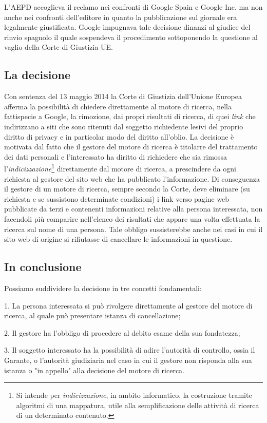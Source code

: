L'AEPD accoglieva il reclamo nei confronti di Google Spain e Google Inc. ma non anche nei confronti dell'editore in quanto la pubblicazione sul giornale era legalmente giustificata.
Google impugnava tale decisione dinanzi al giudice del rinvio spagnolo il quale sospendeva il procedimento sottoponendo la questione al vaglio della Corte di Giustizia UE.
\subsection{La decisione}
Con sentenza del 13 maggio 2014 la Corte di Giustizia dell'Unione Europea afferma la possibilità di chiedere direttamente al motore di ricerca, nella fattispecie a Google, la rimozione, dai propri risultati di ricerca, di quei \textit{link} che indirizzano a siti che sono ritenuti dal soggetto richiedente lesivi del proprio diritto di privacy e in particolar modo del diritto all'oblio.
La decisione è motivata dal fatto che il gestore del motore di ricerca è titolarre del trattamento dei dati personali e l'interessato ha diritto di richiedere che sia rimossa l'\textit{indicizzazione}\footnote{Si intende per \textit{indicizzazione}, in ambito informatico, la costruzione tramite algoritmi di una mappatura, utile alla semplificazione delle attività di ricerca di un determinato contenuto.} direttamente dal motore di ricerca, a prescindere da ogni richiesta al gestore del sito web che ha pubblicato l'informazione. Di conseguenza il gestore di un motore di ricerca, sempre secondo la Corte, deve eliminare (su richiesta e se sussistono determinate condizioni) i link verso pagine web pubblicate da terzi e contenenti informazioni relative alla persona interessata, non facendoli più comparire nell'elenco dei risultati che appare una volta effettuata la ricerca sul nome di una persona. Tale obbligo sussisterebbe anche nei casi in cui il sito web di origine si rifiutasse di cancellare  le informazioni in questione.
\subsection{In conclusione}
Possiamo suddividere la decisione in tre concetti fondamentali:

1. La persona interessata si può rivolgere direttamente al gestore del motore di ricerca, al quale può presentare istanza di cancellazione;

2. Il gestore ha l'obbligo di procedere al debito esame della sua fondatezza;

3. Il soggetto interessato ha la possibilità di adire l'autorità di controllo, ossia il Garante, o l'autorità giudiziaria nel caso in cui il gestore non risponda alla sua istanza o "in appello" alla decisione del motore di ricerca.
